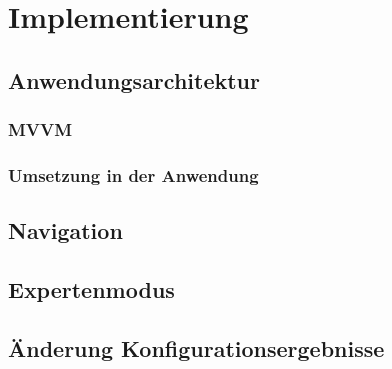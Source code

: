 \chapter{Implementierung}\label{chapter_5}


\section{Anwendungsarchitektur}
\subsection{MVVM}
\subsection{Umsetzung in der Anwendung}

\section{Navigation}
\section{Expertenmodus}
\section{Änderung Konfigurationsergebnisse}
